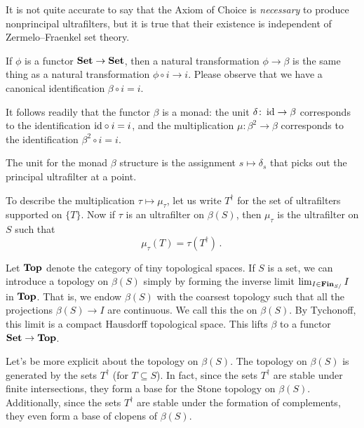 \begin{nul}
	It is not quite accurate to say that the Axiom of Choice is \emph{necessary} to produce nonprincipal ultrafilters, but it is true that their existence is independent of Zermelo--Fraenkel set theory.
\end{nul}

\begin{nul}
	If $ \phi $ is a functor $ \textbf{\textup{Set}} \to \textbf{\textup{Set}} $, then a natural transformation $ \phi \to \beta $ is the same thing as a natural transformation $ \phi \circ i \to i $.
	Please observe that we have a canonical identification $ \beta \circ i = i $.

	It follows readily that the functor $ \beta $ is a monad: the unit $ \delta \colon \operatorname{id} \to \beta $ corresponds to the identification $ {\operatorname{id}} \circ i = i $, and the multiplication $ \mu \colon \beta^2 \to \beta $ corresponds to the identification $ \beta^2 \circ i = i $.

	The unit for the monad $\beta$ structure is the assignment $ s \mapsto \delta_s $ that picks out the principal ultrafilter at a point.

	To describe the multiplication $ \tau \mapsto \mu_{\tau} $, let us write $ T^{\dag} $ for the set of ultrafilters supported on $\{T\}$.
	Now if $ \tau $ is an ultrafilter on $ \beta(S) $, then $ \mu_{\tau} $ is the ultrafilter on $S$ such that
	\[
		\mu_{\tau} ( T ) = \tau ( T^{\dag} ) \period
	\]
\end{nul}

\begin{cnstr}
	Let $ \textbf{\textup{Top}} $ denote the category of tiny topological spaces.
	If $ S $ is a set, we can introduce a topology on $ \beta(S) $ simply by forming the inverse limit $ \lim_{I \in \textbf{\textup{Fin}}_{S/}} I $ in $ \textbf{\textup{Top}} $.
	That is, we endow $ \beta(S) $ with the coarsest topology such that all the projections $ \beta(S) \to I $ are continuous.
	We call this the  on $\beta(S)$.
	By Tychonoff, this limit is a compact Hausdorff topological space.
	This lifts $ \beta $ to a functor $ \textbf{\textup{Set}} \to \textbf{\textup{Top}} $.
\end{cnstr}

\begin{nul}
	Let's be more explicit about the topology on $ \beta(S) $.
	The topology on $ \beta(S) $ is generated by the sets $ T^{\dag} $ (for $ T \subseteq S $).
	In fact, since the sets $ T^{\dag} $ are stable under finite intersections, they form a base for the Stone topology on $ \beta(S) $.
	Additionally, since the sets $ T^{\dag} $ are stable under the formation of complements, they even form a base of clopens of $ \beta(S) $.
\end{nul}

